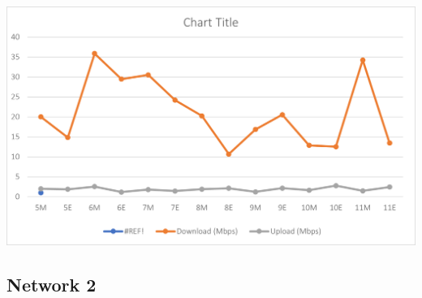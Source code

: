 \documentclass{article}
\begin{document}
\includegraphics{aniairtel.png}
\pagebreak
\subsection{Network 2}
\end{document}
